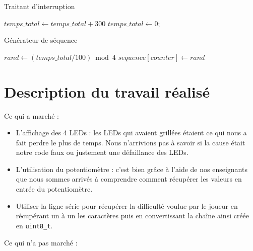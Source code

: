 \documentclass[10pt,a4,french]{article}
\begin{document}
\begin{algorithm}
\caption{Traitant d'interruption}\label{traitant}
\begin{algorithmic}[1]
		\State $temps\_total \gets temps\_total + 300$
			\State $temps\_total \gets 0$;
		\EndIf
	\EndFunction
\end{algorithmic}
\end{algorithm}

\begin{algorithm}
	\caption{Générateur de séquence}\label{gene}
	\begin{algorithmic}[1]
			\State $rand \gets (temps\_total / 100) \bmod 4$ 
			\State $sequence[counter] \gets rand$
		\EndFunction
	\end{algorithmic}
\end{algorithm}

\section{Description du travail réalisé}

Ce qui a marché :

\begin{itemize}
	\item L'affichage des 4 LEDs : les LEDs qui avaient grillées étaient ce qui nous a fait perdre le plus de temps.
		Nous n'arrivions pas à savoir si la cause était notre code faux ou justement une défaillance des LEDs.
	\item L'utilisation du potentiomètre : c'est bien grâce à l'aide de nos enseignants que nous sommes arrivés à comprendre comment récupérer les valeurs en entrée du potentiomètre.
	\item Utiliser la ligne série pour récupérer la difficulté voulue par le joueur en récupérant un à un les caractères puis en convertissant la chaîne ainsi créée en \texttt{uint8\_t}.
\end{itemize}

Ce qui n'a pas marché :
\end{document}

